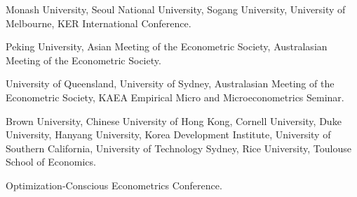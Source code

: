 \documentclass[10pt,letterpaper]{article}
\begin{document}
\begin{description}[font=\mdseries]
\item[2024]
  Monash University,
  Seoul National University,
  Sogang University,
  University of Melbourne,
  KER International Conference.
\item[2023]
  Peking University,
  Asian Meeting of the Econometric Society,
  Australasian Meeting of the Econometric Society.
\item[2022]
  University of Queensland,
  University of Sydney,
  Australasian Meeting of the Econometric Society,
  KAEA Empirical Micro and Microeconometrics Seminar.
\item[2020]
  Brown University,
  Chinese University of Hong Kong,
  Cornell University,
  Duke University,
  Hanyang University,
  Korea Development Institute,
  University of Southern California,
  University of Technology Sydney,
  Rice University,
  Toulouse School of Economics.
\item[2019]
  Optimization-Conscious Econometrics Conference.
\end{description}

%
\end{document}
